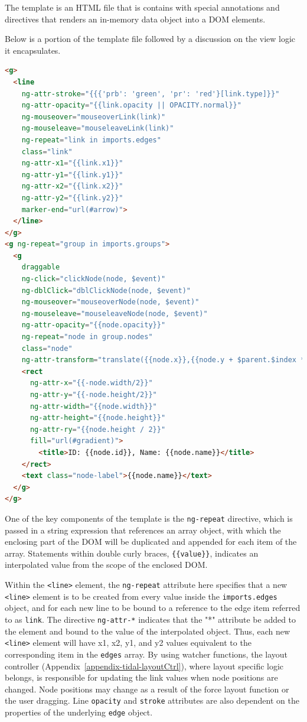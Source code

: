 The template is an HTML file that is contains with special annotations and directives that renders an in-memory data object into a DOM elements.

Below is a portion of the template file followed by a discussion on the view logic it encapsulates.

\begin{lstlisting}[language=html]
<g>
  <line
    ng-attr-stroke="{{{'prb': 'green', 'pr': 'red'}[link.type]}}"
    ng-attr-opacity="{{link.opacity || OPACITY.normal}}"
    ng-mouseover="mouseoverLink(link)"
    ng-mouseleave="mouseleaveLink(link)"
    ng-repeat="link in imports.edges"
    class="link"
    ng-attr-x1="{{link.x1}}"
    ng-attr-y1="{{link.y1}}"
    ng-attr-x2="{{link.x2}}"
    ng-attr-y2="{{link.y2}}"
    marker-end="url(#arrow)">
  </line>
</g>
<g ng-repeat="group in imports.groups">
  <g
    draggable
    ng-click="clickNode(node, $event)"
    ng-dblClick="dblClickNode(node, $event)"
    ng-mouseover="mouseoverNode(node, $event)"
    ng-mouseleave="mouseleaveNode(node, $event)"
    ng-attr-opacity="{{node.opacity}}"
    ng-repeat="node in group.nodes"
    class="node"
    ng-attr-transform="translate({{node.x}},{{node.y + $parent.$index * imports.subgraph.height}})">
    <rect
      ng-attr-x="{{-node.width/2}}"
      ng-attr-y="{{-node.height/2}}"
      ng-attr-width="{{node.width}}"
      ng-attr-height="{{node.height}}"
      ng-attr-ry="{{node.height / 2}}"
      fill="url(#gradient)">
        <title>ID: {{node.id}}, Name: {{node.name}}</title>
    </rect>
    <text class="node-label">{{node.name}}</text>
  </g>
</g>

\end{lstlisting}

One of the key components of the template is the \texttt{ng-repeat} directive, which is passed in a string expression that references an array object, with which the enclosing part of the DOM will be duplicated and appended for each item of the array.
Statements within double curly braces, \texttt{\{\{value\}\}}, indicates an interpolated value from the scope of the enclosed DOM.

Within the \texttt{<line>} element, the \texttt{ng-repeat} attribute here specifies that a new \texttt{<line>} element is to be created from every value inside the \texttt{imports.edges} object, and for each new line to be bound to a reference to the edge item referred to as \texttt{link}.
The directive \texttt{ng-attr-*} indicates that the "*" attribute be added to the element and bound to the value of the interpolated object.
Thus, each new \texttt{<line>} element will have x1, x2, y1, and y2 values equivalent to the corresponding item in the \texttt{edges} array.
By using watcher functions, the layout controller (Appendix~\ref{appendix-tidal-layoutCtrl}), where layout specific logic belongs, is responsible for updating the link values when node positions are changed.
Node positions may change as a result of the force layout function or the user dragging.
Line \texttt{opacity} and \texttt{stroke} attributes are also dependent on the properties of the underlying \texttt{edge} object.

